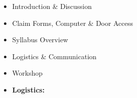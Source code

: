\def\fri{1/15}%
\def\dMon{1/18}%
\def\dTues{1/19}%
\def\dWed{1/20}%
\def\dThur{1/21}%
\placeDate

\begin{itemize}[noitemsep,topsep=0pt,leftmargin=*]
      \item Introduction \& Discussion
      \item Claim Forms, Computer \& Door Access
      \item Syllabus Overview
      \item Logistics \& Communication
      \item Workshop
\end{itemize}
\vspace{1em}
\begin{itemize}[noitemsep,topsep=0pt,leftmargin=*]
      \item \textbf{Logistics:}

\end{itemize}

